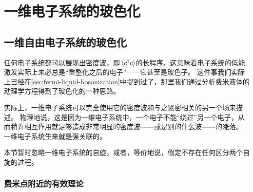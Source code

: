 \chapter{一维电子系统的玻色化}\label{chap:luttinger-liquid}

\section{一维自由电子系统的玻色化}\label{sec:one-dim-free}

任何电子系统都可以展现出密度波，即$\expval*{{c}^\dagger {c}}$的长程序，这意味着电子系统的低能激发实际上未必总是“重整化之后的电子”——它甚至是玻色子。
这件事我们实际上已经在\autoref{sec:fermi-liquid-bosonization}中提到过了，那里我们通过分析费米液体的动理学方程得到了玻色化的一种思路。

实际上，一维电子系统可以完全使用它的密度波和与之紧密相关的另一个场来描述。
物理地说，这是因为一维电子系统中，一个电子不能“绕过”另一个电子，从而稍许相互作用就足够造成非常明显的密度波——或是别的什么波——的涨落。
一维电子系统生来就是强关联的。

本节暂时忽略一维电子系统的自旋，或者，等价地说，假定不存在任何区分两个自旋的过程。

\subsection{费米点附近的有效理论}

